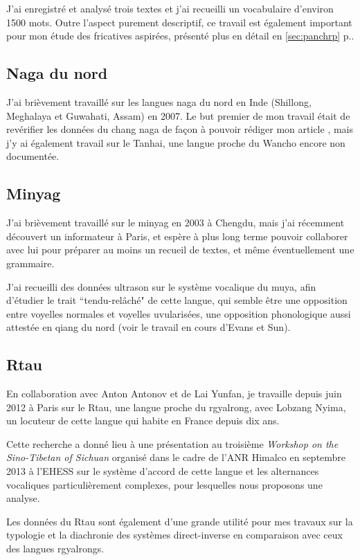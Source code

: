 \documentclass[oldfontcommands,oneside,a4paper,11pt]{memoir}
\begin{document}
J'ai enregistré et analysé trois textes et j'ai recueilli un vocabulaire d'environ 1500 mots.  Outre l'aspect purement descriptif, ce travail est également important pour mon étude des fricatives aspirées, présenté plus en détail en \ref{sec:panchrp} p.\pageref{sec:panchrp}.

\subsection{Naga du nord}
J'ai brièvement travaillé sur les langues naga du nord en Inde (Shillong, Meghalaya et Guwahati, Assam) en 2007. Le but premier de mon travail était de revérifier les données du chang naga de façon à pouvoir rédiger mon article \citet{jacques07chang}, mais j'y ai également travail sur le Tanhai, une langue proche du Wancho encore non documentée. 


\subsection{Minyag}
J'ai brièvement travaillé sur le minyag en 2003 à Chengdu, mais j'ai récemment découvert un informateur à Paris, et espère à plus long terme pouvoir collaborer avec lui pour préparer au moins un recueil de textes, et même éventuellement une grammaire.

J'ai recueilli des données ultrason sur le système vocalique du muya, afin d'étudier le trait ``tendu-relâché" de cette langue, qui semble être une opposition entre voyelles normales et voyelles uvularisées, une opposition phonologique aussi attestée en qiang du nord (voir le travail en cours d'Evans et Sun).

\subsection{Rtau}
En collaboration avec Anton Antonov et de Lai Yunfan, je travaille depuis juin 2012 à Paris sur le Rtau, une langue proche du rgyalrong, avec Lobzang Nyima, un  locuteur de cette langue qui habite en France depuis dix ans. 

Cette recherche a donné lieu à une présentation au troisième \textit{Workshop on the Sino-Tibetan of Sichuan} organisé dans le cadre de l'ANR Himalco en septembre 2013 à l'EHESS sur le système d'accord de cette langue et les alternances vocaliques particulièrement complexes, pour lesquelles nous proposons une analyse.

Les données du Rtau sont également d'une grande utilité pour mes travaux sur la typologie et la diachronie des systèmes direct-inverse en comparaison avec ceux des langues rgyalrongs.
\end{document}
